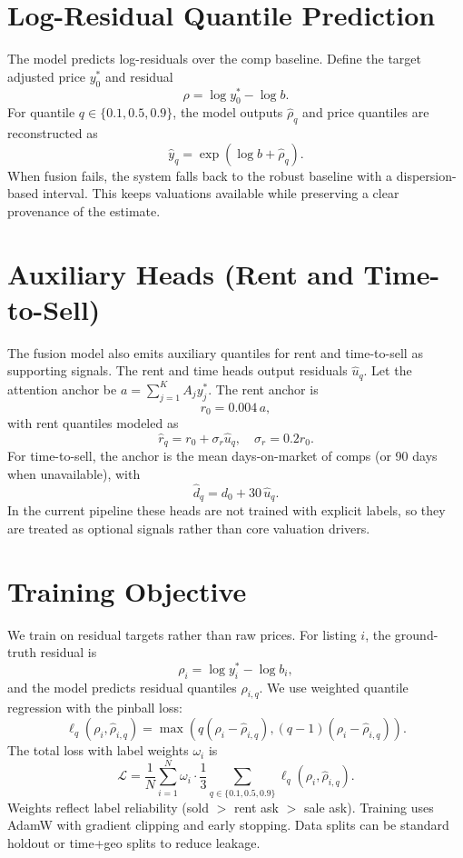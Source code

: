 \documentclass[11pt,a4paper]{article}
\begin{document}
\section{Log-Residual Quantile Prediction}
The model predicts log-residuals over the comp baseline. Define the target
adjusted price $y_0^{\ast}$ and residual
\begin{equation}
 \rho = \log y_0^{\ast} - \log b.
\end{equation}
For quantile $q \in \{0.1, 0.5, 0.9\}$, the model outputs $\hat{\rho}_q$ and
price quantiles are reconstructed as
\begin{equation}
 \hat{y}_q = \exp(\log b + \hat{\rho}_q).
\end{equation}
When fusion fails, the system falls back to the robust baseline with a
dispersion-based interval. This keeps valuations available while preserving a
clear provenance of the estimate.

\section{Auxiliary Heads (Rent and Time-to-Sell)}
The fusion model also emits auxiliary quantiles for rent and time-to-sell as
supporting signals. The rent and time heads output residuals $\hat{u}_q$.
Let the attention anchor be
$a = \sum_{j=1}^K A_j y_j^{\ast}$. The rent anchor is
\begin{equation}
 r_0 = 0.004\,a,
\end{equation}
with rent quantiles modeled as
\begin{equation}
 \hat{r}_q = r_0 + \sigma_r \hat{u}_q, \quad \sigma_r = 0.2 r_0.
\end{equation}
For time-to-sell, the anchor is the mean days-on-market of comps (or 90 days
when unavailable), with
\begin{equation}
 \hat{d}_q = d_0 + 30\,\hat{u}_q.
\end{equation}
In the current pipeline these heads are not trained with explicit labels, so
they are treated as optional signals rather than core valuation drivers.

\section{Training Objective}
We train on residual targets rather than raw prices. For listing $i$, the
ground-truth residual is
\[
\rho_i = \log y_i^{\ast} - \log b_i,
\]
and the model predicts residual quantiles $\hat{\rho}_{i,q}$. We use weighted
quantile regression with the pinball loss:
\begin{equation}
\ell_q(\rho_i, \hat{\rho}_{i,q}) = \max\left(q(\rho_i - \hat{\rho}_{i,q}), (q-1)(\rho_i - \hat{\rho}_{i,q})\right).
\end{equation}
The total loss with label weights $\omega_i$ is
\begin{equation}
\mathcal{L} = \frac{1}{N} \sum_{i=1}^N \omega_i \cdot
\frac{1}{3} \sum_{q \in \{0.1,0.5,0.9\}} \ell_q(\rho_i, \hat{\rho}_{i,q}).
\end{equation}
Weights reflect label reliability (sold $>$ rent ask $>$ sale ask). Training
uses AdamW with gradient clipping and early stopping. Data splits can be
standard holdout or time+geo splits to reduce leakage.
\end{document}
